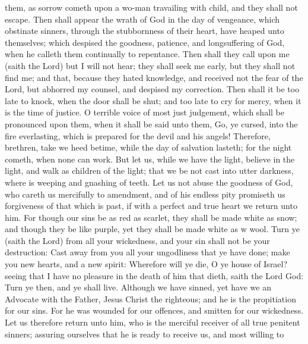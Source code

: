 them, as sorrow cometh upon a wo-man travailing with child, and they shall not escape. Then shall appear the wrath of God in the day of vengeance, which obstinate sinners, through the stubbornness of their heart, have heaped unto themselves; which despised the goodness, patience, and longsuffering of God, when he calleth them continually to repentance. Then shall they call upon me (saith the Lord) but I will not hear; they shall seek me early, but they shall not find me; and that, because they hated knowledge, and received not the fear of the Lord, but abhorred my counsel, and despised my correction. Then shall it be too late to knock, when the door shall be shut; and too late to cry for mercy, when it is the time of justice. O terrible voice of most just judgement, which shall be pronounced upon them, when it shall be said unto them, Go, ye cursed, into the fire everlasting, which is prepared for the devil and his angels! Therefore, brethren, take we heed betime, while the day of salvation lasteth; for the night cometh, when none can work. But let us, while we have the light, believe in the light, and walk as children of the light; that we be not cast into utter darkness, where is weeping and gnashing of teeth. Let us not abuse the goodness of God, who careth us mercifully to amendment, and of his endless pity promiseth us forgiveness of that which is past, if with a perfect and true heart we return unto him. For though our sins be as red as scarlet, they shall be made white as snow; and though they be like purple, yet they shall be made white as w wool. Turn ye (saith the Lord) from all your wickedness, and your sin shall not be your destruction: Cast away from you all your ungodliness that ye have done; make you new hearts, and a new spirit: Wherefore will ye die, O ye house of Israel? seeing that I have no pleasure in the death of him that dieth, saith the Lord God: Turn ye then, and ye shall live. Although we have sinned, yet have we an Advocate with the Father, Jesus Christ the righteous; and he is the propitiation for our sins. For he was wounded for our offences, and smitten for our wickedness. Let us therefore return unto him, who is the merciful receiver of all true penitent sinners; assuring ourselves that he is ready to receive us, and most willing to

